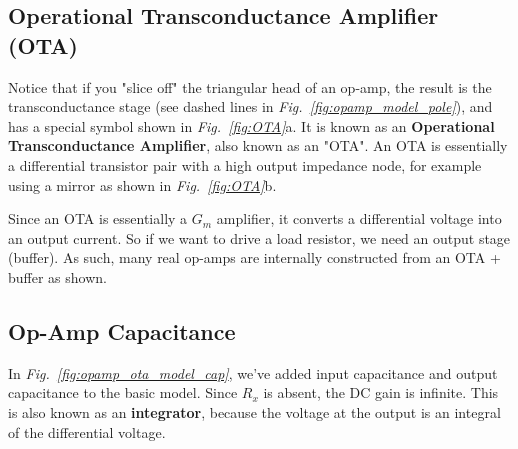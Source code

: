 \subsection{Operational Transconductance Amplifier (OTA)}
Notice that if you "slice off" the triangular head of an op-amp, the result is the transconductance stage (see dashed lines in \emph{Fig.~\ref{fig:opamp_model_pole}}), and has a special symbol shown in \emph{Fig.~\ref{fig:OTA}}a.  It is known as an \textbf{Operational Transconductance Amplifier}, also known as an "OTA".  An OTA is essentially a differential transistor pair with a high output impedance node, for example using a mirror as shown in \emph{Fig.~\ref{fig:OTA}}b.

Since an OTA is essentially a $G_m$ amplifier, it converts a differential voltage into an output current.  So if we want to drive a load resistor, we need an output stage (buffer).  As such, many real op-amps are internally constructed from an OTA + buffer as shown.
\subsection{Op-Amp Capacitance}
In \emph{Fig.~\ref{fig:opamp_ota_model_cap}}, we've added input capacitance and output capacitance to the basic model.  Since $R_x$ is absent, the DC gain is infinite.  This is also known as an \textbf{integrator}, because the voltage at the output is an integral of the differential voltage.    

